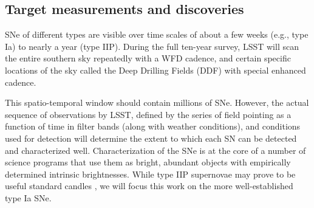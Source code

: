 \subsection{Target measurements and discoveries}
\label{sec:\secname:targets}

SNe of different types are visible over time scales of about a few
weeks (e.g., type Ia) to nearly a year (type IIP).  During the full
ten-year survey, LSST will scan the entire southern sky repeatedly with
a WFD cadence, and certain specific locations of the sky called the Deep
Drilling Fields (DDF) with special enhanced cadence.

This spatio-temporal window should contain millions
of SNe. However, the actual sequence of
observations by LSST, defined by the series of field pointing as a
function of time in filter bands (along with weather conditions), and
conditions used for detection will determine the extent to which each
SN can be detected and characterized well.  Characterization of the SNe
is at the core of a number of science
programs that use them as bright, abundant objects with empirically
determined intrinsic brightnesses. While type IIP supernovae may prove to be useful standard
candles \citep{Sanders2014}, we will focus this work on the more well-established type Ia SNe.

